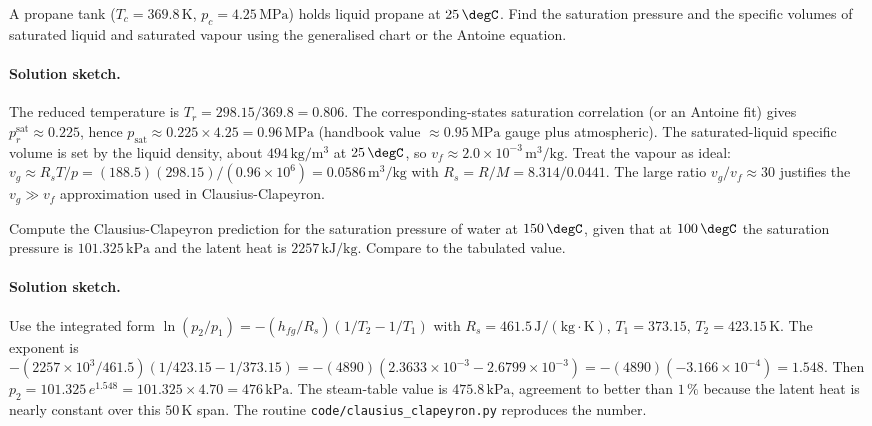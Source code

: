 \begin{exercise}
A propane tank ($T_c = 369.8\,\si{\kelvin}$, $p_c = 4.25\,\text{MPa}$)
holds liquid propane at $25\,\degC$. Find the saturation pressure
and the specific volumes of saturated liquid and saturated vapour
using the generalised chart or the Antoine equation.

\paragraph{Solution sketch.} The reduced temperature is $T_r =
298.15/369.8 = 0.806$. The corresponding-states saturation correlation
(or an Antoine fit) gives $p_r^{\text{sat}} \approx 0.225$, hence
$p_{\text{sat}} \approx 0.225\times 4.25 = 0.96\,\text{MPa}$ (handbook
value $\approx 0.95\,\text{MPa}$ gauge plus atmospheric). The
saturated-liquid specific volume is set by the liquid density, about
$494\,\text{kg}/\text{m}^3$ at $25\,\degC$, so $v_f \approx 2.0\times
10^{-3}\,\text{m}^3/\text{kg}$. Treat the vapour as ideal: $v_g \approx
R_s T/p = (188.5)(298.15)/(0.96\times 10^6) = 0.0586\,\text{m}^3/
\text{kg}$ with $R_s = R/M = 8.314/0.0441$. The large ratio $v_g/v_f
\approx 30$ justifies the $v_g \gg v_f$ approximation used in
Clausius-Clapeyron.
\end{exercise}

\begin{exercise}
Compute the Clausius-Clapeyron prediction for the saturation pressure
of water at $150\,\degC$, given that at $100\,\degC$ the saturation
pressure is $101.325\,\text{kPa}$ and the latent heat is $2257\,
\text{kJ}/\text{kg}$. Compare to the tabulated value.

\paragraph{Solution sketch.} Use the integrated form $\ln(p_2/p_1) =
-(h_{fg}/R_s)(1/T_2 - 1/T_1)$ with $R_s = 461.5\,\text{J}/(\text{kg}
\cdot\si{\kelvin})$, $T_1 = 373.15$, $T_2 = 423.15\,\si{\kelvin}$. The
exponent is $-(2257\times 10^3/461.5)(1/423.15 - 1/373.15) =
-(4890)(2.3633\times 10^{-3} - 2.6799\times 10^{-3}) = -(4890)(-3.166
\times 10^{-4}) = 1.548$. Then $p_2 = 101.325\,e^{1.548} = 101.325\times
4.70 = 476\,\text{kPa}$. The steam-table value is $475.8\,\text{kPa}$,
agreement to better than $1\,\%$ because the latent heat is nearly
constant over this $50\,\si{\kelvin}$ span. The routine
\texttt{code/clausius\_clapeyron.py} reproduces the number.
\end{exercise}

